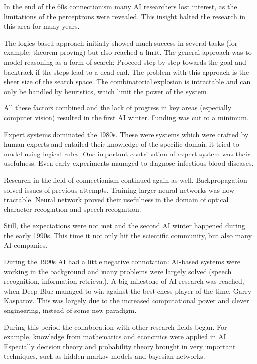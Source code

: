 \documentclass[draft,final,oneside]{vutinfth} %
\begin{document}
In the end of the 60s connectionism many AI researchers lost interest, as the limitations of the perceptrons were revealed. This insight halted the research in this area for many years.

The logics-based approach initially showed much success in several tasks (for example: theorem proving) but also reached a limit. The general approach was to model reasoning as a form of search: Proceed step-by-step towards the goal and backtrack if the steps lead to a dead end. The problem with this approach is the sheer size of the search space. The combinatorial explosion is intractable and can only be handled by heuristics, which limit the power of the system.

All these factors combined and the lack of progress in key areas (especially computer vision) resulted in the first AI winter. Funding was cut to a minimum.

Expert systems dominated the 1980s. These were systems which were crafted by human experts and entailed their knowledge of the specific domain it tried to model using logical rules. One important contribution of expert system was their usefulness. Even early experiments managed to diagnose infectious blood diseases. \cite{historyai}

Research in the field of connectionism continued again as well. Backpropagation solved issues of previous attempts. Training larger neural networks was now tractable. Neural network proved their usefulness in the domain of optical character recognition and speech recognition.

Still, the expectations were not met and the second AI winter happened during the early 1990s. This time it not only hit the scientific community, but also many AI companies.

During the 1990s AI had a little negative connotation: AI-based systems were working in the background and many problems were largely solved (speech recognition, information retrieval). A big milestone of AI research was reached, when Deep Blue managed to win against the best chess player of the time, Garry Kasparov. This was largely due to the increased computational power and clever engineering, instead of some new paradigm.

During this period the collaboration with other research fields began. For example, knowledge from mathematics and economics were applied in AI. Especially decision theory and probability theory brought in very important techniques, such as hidden markov models and bayesian networks. \cite{statisticsinml}
\end{document}
